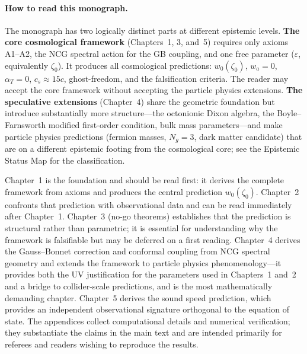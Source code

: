 \documentclass[10pt,a4paper,openany,twocolumn]{book}
\theoremstyle{definition}
\theoremstyle{remark}
\begin{document}
\paragraph{How to read this monograph.} The monograph has two logically distinct parts at different epistemic levels. \textbf{The core cosmological framework} (Chapters~1, 3, and~5) requires only axioms A1--A2, the NCG spectral action for the GB coupling, and one free parameter ($\varepsilon$, equivalently $\zeta_0$). It produces all cosmological predictions: $w_0(\zeta_0)$, $w_a = 0$, $\alpha_T = 0$, $c_s \approx 15c$, ghost-freedom, and the falsification criteria. The reader may accept the core framework without accepting the particle physics extensions. \textbf{The speculative extensions} (Chapter~4) share the geometric foundation but introduce substantially more structure---the octonionic Dixon algebra, the Boyle--Farnsworth modified first-order condition, bulk mass parameters---and make particle physics predictions (fermion masses, $N_g = 3$, dark matter candidate) that are on a different epistemic footing from the cosmological core; see the Epistemic Status Map for the classification.

Chapter~1 is the foundation and should be read first: it derives the complete framework from axioms and produces the central prediction $w_0(\zeta_0)$. Chapter~2 confronts that prediction with observational data and can be read immediately after Chapter~1. Chapter~3 (no-go theorems) establishes that the prediction is structural rather than parametric; it is essential for understanding why the framework is falsifiable but may be deferred on a first reading. Chapter~4 derives the Gauss--Bonnet correction and conformal coupling from NCG spectral geometry and extends the framework to particle physics phenomenology---it provides both the UV justification for the parameters used in Chapters~1 and~2 and a bridge to collider-scale predictions, and is the most mathematically demanding chapter. Chapter~5 derives the sound speed prediction, which provides an independent observational signature orthogonal to the equation of state. The appendices collect computational details and numerical verification; they substantiate the claims in the main text and are intended primarily for referees and readers wishing to reproduce the results.
\end{document}
